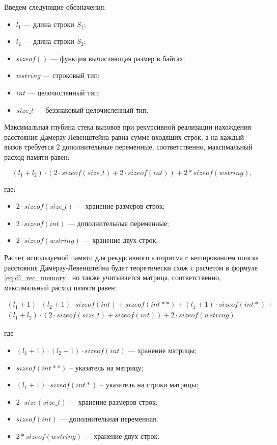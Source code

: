 Введем следующие обозначения:
\begin{itemize}[label=--]
	\item$l_1$ --- длина строки $S_{1}$;
	\item$l_2$ --- длина строки $S_{2}$;
	\item$sizeof()$ --- функция вычисляющая размер в байтах;
	\item $wstring$ --- строковый тип;
	\item $int$ --- целочисленный тип;
	\item $size\_t$ --- беззнаковый целочисленный тип.
\end{itemize}

Максимальная глубина стека вызовов при рекурсивной реализации нахождения расстояния Дамерау-Левенштейна равна сумме входящих строк, а на каждый вызов требуется 2 дополнительные переменные, соответственно, максимальный расход памяти равен:

\begin{equation}
	\label{eq:dl_rec_memory}
	(l_1 + l_2) \cdot ( 2 \cdot sizeof(size\_t)  + 2 \cdot sizeof(int)) + 2 * sizeof(wstring),
\end{equation}

где:
\begin{itemize}[label=--]
	\item $2 \cdot sizeof(size\_t)$ --- хранение размеров строк;
	\item $2 \cdot sizeof(int)$ --- дополнительные переменные;
	\item $2 \cdot sizeof(wstring)$ --- хранение двух строк.
\end{itemize}

Расчет используемой памяти для рекурсивного алгоритма c кешированием поиска расстояния Дамерау-Левенштейна будет теоретически схож с расчетом в формуле \ref{eq:dl_rec_memory}, но также учитывается матрица, соответственно, максимальный расход памяти равен:

\begin{equation}
	\label{eq:dl_hash_memory}
	\begin{aligned}
		(l_1 + 1) \cdot (l_2 + 1) \cdot sizeof(int) + sizeof(int **) + (l_1 + 1) \cdot sizeof(int *) + \\
		(l_1 + l_2) \cdot (2 \cdot sizeof(size\_t) + sizeof(int)) + 2 \cdot sizeof(wstring)
	\end{aligned}
\end{equation}

где 
\begin{itemize} [label=--]
	\item $(l_1 + 1) \cdot (l_2 + 1) \cdot sizeof(int)$ --- хранение матрицы;
	\item $sizeof(int **)$ -- указатель на матрицу;
	\item $(l_1 + 1) \cdot sizeof(int *)$ -- указатель на строки матрицы;
	\item $2 \cdot size(size\_t)$ --- хранение размеров строк;
	\item $sizeof(int)$ --- дополнительная переменная;
	\item $2 * sizeof(wstring)$ --- хранение двух строк.
\end{itemize}

